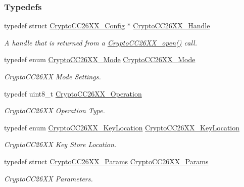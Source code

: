 \subsubsection*{Typedefs}
\begin{DoxyCompactItemize}
\item 
typedef struct \hyperlink{struct_crypto_c_c26_x_x___config}{Crypto\+C\+C26\+X\+X\+\_\+\+Config} $\ast$ \hyperlink{_crypto_c_c26_x_x_8h_a8737c63107a1cb5548ba06f7a48259b5}{Crypto\+C\+C26\+X\+X\+\_\+\+Handle}
\begin{DoxyCompactList}\small\item\em A handle that is returned from a \hyperlink{_crypto_c_c26_x_x_8h_a21aa1458d0b063ee3637a40487e8ee12}{Crypto\+C\+C26\+X\+X\+\_\+open()} call. \end{DoxyCompactList}\item 
typedef enum \hyperlink{_crypto_c_c26_x_x_8h_abf86c8ac428559f00fed3299d439e2cd}{Crypto\+C\+C26\+X\+X\+\_\+\+Mode} \hyperlink{_crypto_c_c26_x_x_8h_a2a7a223869fb2c7f4b577f3552563d16}{Crypto\+C\+C26\+X\+X\+\_\+\+Mode}
\begin{DoxyCompactList}\small\item\em Crypto\+C\+C26\+X\+X Mode Settings. \end{DoxyCompactList}\item 
typedef uint8\+\_\+t \hyperlink{_crypto_c_c26_x_x_8h_a28465385e5b45efecc00f2015605f970}{Crypto\+C\+C26\+X\+X\+\_\+\+Operation}
\begin{DoxyCompactList}\small\item\em Crypto\+C\+C26\+X\+X Operation Type. \end{DoxyCompactList}\item 
typedef enum \hyperlink{_crypto_c_c26_x_x_8h_a5266637af2c4ac36ed58d4e0f158b706}{Crypto\+C\+C26\+X\+X\+\_\+\+Key\+Location} \hyperlink{_crypto_c_c26_x_x_8h_a4e214e5283d16ac67e593c7c8a5bc058}{Crypto\+C\+C26\+X\+X\+\_\+\+Key\+Location}
\begin{DoxyCompactList}\small\item\em Crypto\+C\+C26\+X\+X Key Store Location. \end{DoxyCompactList}\item 
typedef struct \hyperlink{struct_crypto_c_c26_x_x___params}{Crypto\+C\+C26\+X\+X\+\_\+\+Params} \hyperlink{_crypto_c_c26_x_x_8h_afd8b8a794d92fe38d4806238c3b6fef7}{Crypto\+C\+C26\+X\+X\+\_\+\+Params}
\begin{DoxyCompactList}\small\item\em Crypto\+C\+C26\+X\+X Parameters. \end{DoxyCompactList}\item 

\end{DoxyCompactItemize}
